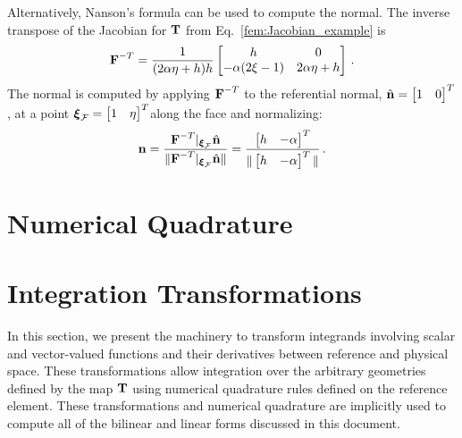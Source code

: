 \documentclass[../doc.tex]{subfiles}
\begin{document}
Alternatively, Nanson's formula can be used to compute the normal. The inverse transpose of the Jacobian for $\boldsymbol{\mathrm{T}}$ from Eq.~\ref{fem:Jacobian_example} is 
	\begin{equation}
		\boldsymbol{\mathrm{F}}^{-T} = \frac{1}{(2\alpha \eta + h)h} \begin{bmatrix} 
			h & 0 \\ 
			-\alpha(2\xi-1) & 2\alpha\eta+h
		\end{bmatrix} \,. 
	\end{equation}
The normal is computed by applying $\boldsymbol{\mathrm{F}}^{-T}$ to the referential normal, $\hat{\boldsymbol{\mathrm{n}}} = \begin{bmatrix} 1&0 \end{bmatrix}^T$, at a point $\boldsymbol{\xi}_\mathcal{F} = \begin{bmatrix} 1 & \eta \end{bmatrix}^T$along the face and normalizing: 
	\begin{equation}
		\boldsymbol{\mathrm{n}} = \frac{\boldsymbol{\mathrm{F}}^{-T}|_{\boldsymbol{\xi}_\mathcal{F}}\hat{\boldsymbol{\mathrm{n}}}}{\|\boldsymbol{\mathrm{F}}^{-T}|_{\boldsymbol{\xi}_\mathcal{F}}\hat{\boldsymbol{\mathrm{n}}}\|} = \frac{\begin{bmatrix} h & -\alpha \end{bmatrix}^T}{\|\begin{bmatrix} h & -\alpha \end{bmatrix}^T\|} \,. 
	\end{equation}

\section{Numerical Quadrature}

\section{Integration Transformations} \label{fem_sec:int_trans}
In this section, we present the machinery to transform integrands involving scalar and vector-valued functions and their derivatives between reference and physical space. These transformations allow integration over the arbitrary geometries defined by the map $\boldsymbol{\mathrm{T}}$ using numerical quadrature rules defined on the reference element. These transformations and numerical quadrature are implicitly used to compute all of the bilinear and linear forms discussed in this document. 
\end{document}
